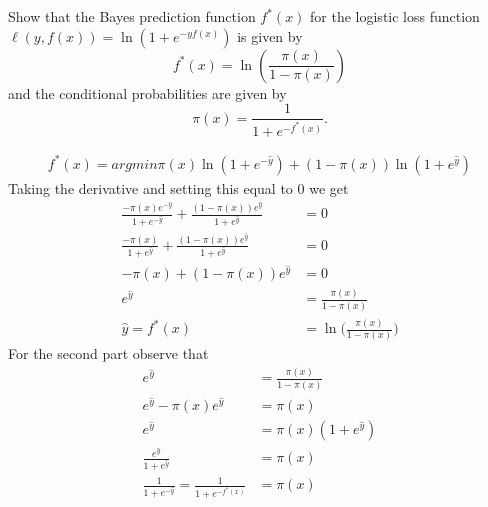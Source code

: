 \documentclass[12pt,letterpaper]{article}
\begin{document}
\begin{problem}{2.3}
    Show that the Bayes prediction function $f^{*}(x)$ for the logistic
    loss function $\ell\left(y,f(x)\right)=\ln\left(1+e^{-yf(x)}\right)$
    is given by
    \[
    f^{*}(x)=\ln\left(\frac{\pi(x)}{1-\pi(x)}\right)
    \]
    and the conditional probabilities are given by
    \[
    \pi(x)=\frac{1}{1+e^{-f^{*}(x)}}.
    \]
\end{problem}
\begin{solution}{}
    \begin{align*}
        f^*(x) = argmin \pi(x)\ln(1+e^{-\hat{y}}) + (1-\pi(x))\ln(1+e^{\hat{y}})
    \end{align*}
    Taking the derivative and setting this equal to 0 we get
    \begin{align*}
        \frac{-\pi(x)e^{-\hat{y}}}{1+e^{-\hat{y}}} + \frac{(1-\pi(x))e^{\hat{y}}}{1+e^{\hat{y}}} &= 0\\
        \frac{-\pi(x)}{1+e^{\hat{y}}} + \frac{(1-\pi(x))e^{\hat{y}}}{1+e^{\hat{y}}} &= 0\\
        -\pi(x) + (1-\pi(x))e^\hat{y} &= 0\\
        e^\hat{y} &= \frac{\pi(x)}{1-\pi(x)}\\
        \hat{y} = f^*(x) &= \ln\bigg(\frac{\pi(x)}{1-\pi(x)}\bigg)
    \end{align*}
    For the second part observe that
    \begin{align*}
         e^\hat{y} &= \frac{\pi(x)}{1-\pi(x)}\\
         e^\hat{y} - \pi(x)e^\hat{y} &= \pi(x)\\
         e^\hat{y} &= \pi(x)(1+e^\hat{y})\\
         \frac{e^\hat{y}}{1+e^\hat{y}} &= \pi(x)\\
         \frac{1}{1+e^{-\hat{y}}} = \frac{1}{1+e^{-f^*(x)}} &= \pi(x)
    \end{align*}
\end{solution}
\newpage
\end{document}
